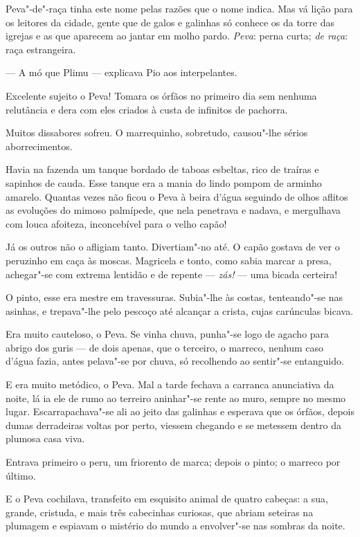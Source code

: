 Peva"-de"-raça tinha este nome pelas razões que o nome indica. Mas vá
lição para os leitores da cidade, gente que de galos e galinhas só
conhece os da torre das igrejas e as que aparecem ao jantar em molho
pardo. \emph{Peva}: perna curta; \emph{de raça}: raça estrangeira.

--- A mó que Plimu --- explicava Pio aos interpelantes.

Excelente sujeito o Peva! Tomara os órfãos no primeiro dia sem nenhuma
relutância e dera com eles criados à custa de infinitos de pachorra.

Muitos dissabores sofreu. O marrequinho, sobretudo, causou"-lhe sérios
aborrecimentos.

Havia na fazenda um tanque bordado de taboas esbeltas, rico de traíras e
sapinhos de cauda. Esse tanque era a mania do lindo pompom de arminho
amarelo. Quantas vezes não ficou o Peva à beira d'água seguindo de olhos
aflitos as evoluções do mimoso palmípede, que nela penetrava e nadava, e
mergulhava com louca afoiteza, inconcebível para o velho capão!

Já os outros não o afligiam tanto. Divertiam"-no até. O capão gostava de
ver o peruzinho em caça às moscas. Magricela e tonto, como sabia marcar
a presa, achegar"-se com extrema lentidão e de repente --- \emph{zás!}
--- uma bicada certeira!

O pinto, esse era mestre em travessuras. Subia"-lhe às costas,
tenteando"-se nas asinhas, e trepava"-lhe pelo pescoço até alcançar a
crista, cujas carúnculas bicava.

Era muito cauteloso, o Peva. Se vinha chuva, punha"-se logo de agacho
para abrigo dos guris --- de dois apenas, que o terceiro, o marreco,
nenhum caso d'água fazia, antes pelava"-se por chuva, só recolhendo ao
sentir"-se entanguido.

E era muito metódico, o Peva. Mal a tarde fechava a carranca anunciativa
da noite, lá ia ele de rumo ao terreiro aninhar"-se rente ao muro, sempre
no mesmo lugar. Escarrapachava"-se ali ao jeito das galinhas e esperava
que os órfãos, depois dumas derradeiras voltas por perto, viessem
chegando e se metessem dentro da plumosa casa viva.

Entrava primeiro o peru, um friorento de marca; depois o pinto; o
marreco por último.

E o Peva cochilava, transfeito em esquisito animal de quatro cabeças: a
sua, grande, cristuda, e mais três cabecinhas curiosas, que abriam
seteiras na plumagem e espiavam o mistério do mundo a envolver"-se nas
sombras da noite.

